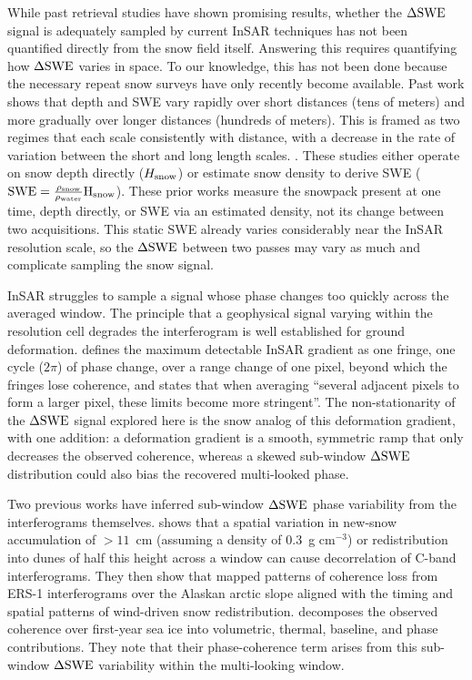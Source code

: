 \documentclass[journal abbreviation, manuscript]{copernicus}
\begin{document}
While past retrieval studies have shown promising results, whether the $\Delta\mathrm{SWE}$ signal is adequately sampled by current InSAR techniques has not been quantified directly from the snow field itself. Answering this requires quantifying how $\Delta\mathrm{SWE}$ varies in space. To our knowledge, this has not been done because the necessary repeat snow surveys have only recently become available. Past work shows that depth and SWE vary rapidly over short distances (tens of meters) and more gradually over longer distances (hundreds of meters). This is framed as two regimes that each scale consistently with distance, with a decrease in the rate of variation between the short and long length scales. \citep{deems2006, trujillo2007topographic-0ec, Clark2011, mendoza2020, Miller2022}. These studies either operate on snow depth directly ($H_{\mathrm{snow}}$) or estimate snow density to derive SWE ($\rm SWE = \frac{\rho_{\mathrm{snow}}}{\rho_{\mathrm{water}}} H_{\mathrm{snow}}$). These prior works measure the snowpack present at one time, depth directly, or SWE via an estimated density, not its change between two acquisitions. This static SWE already varies considerably near the InSAR resolution scale, so the $\Delta\mathrm{SWE}$ between two passes may vary as much and complicate sampling the snow signal.

InSAR struggles to sample a signal whose phase changes too quickly across the averaged window. The principle that a geophysical signal varying within the resolution cell degrades the interferogram is well established for ground deformation. \citet{Massonnet1998} defines the maximum detectable InSAR gradient as one fringe, one cycle ($2\pi$) of phase change, over a range change of one pixel, beyond which the fringes lose coherence, and states that when averaging ``several adjacent pixels to form a larger pixel, these limits become more stringent''. The non-stationarity of the $\Delta\mathrm{SWE}$ signal explored here is the snow analog of this deformation gradient, with one addition: a deformation gradient is a smooth, symmetric ramp that only decreases the observed coherence, whereas a skewed sub-window $\Delta\mathrm{SWE}$ distribution could also bias the recovered multi-looked phase.

Two previous works have inferred sub-window $\Delta\mathrm{SWE}$ phase variability from the interferograms themselves. \citet{LiSturm2002} shows that a spatial variation in new-snow accumulation of $>11$~cm (assuming a density of 0.3~g cm$^{-3}$) or redistribution into dunes of half this height across a window can cause decorrelation of C-band interferograms. They then show that mapped patterns of coherence loss from ERS-1 interferograms over the Alaskan arctic slope aligned with the timing and spatial patterns of wind-driven snow redistribution. \citet{ming2026} decomposes the observed coherence over first-year sea ice into volumetric, thermal, baseline, and phase contributions. They note that their phase-coherence term arises from this sub-window $\Delta\mathrm{SWE}$ variability within the multi-looking window. 
\end{document}
